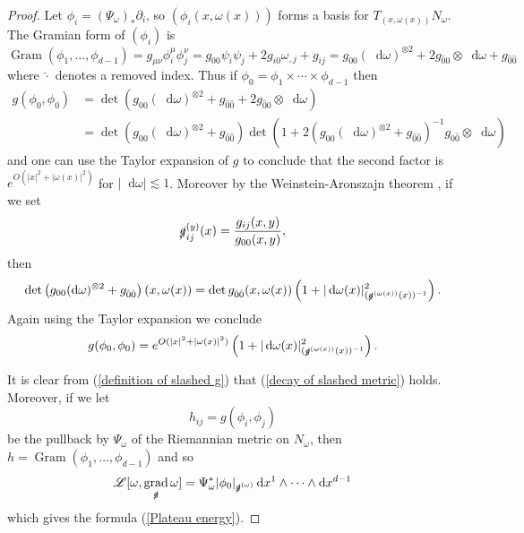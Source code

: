 \documentclass[reqno,12pt,letterpaper]{amsart}
\newcommand*\dif{\mathop{}\!\mathrm{d}}
\DeclareMathOperator{\Gram}{Gram}
\DeclareMathOperator{\grad}{grad}
\newcommand{\Lagrange}{\mathscr L}
\theoremstyle{definition}
\numberwithin{equation}{section}
\begin{document}
\begin{proof}
Let $\phi_i = (\Psi_\omega)_* \partial_i$, so $(\phi_i(x, \omega(x)))$ forms a basis for $T_{(x, \omega(x))} N_\omega$.
The Gramian form of $(\phi_i)$ is
$$\Gram(\phi_1, \dots, \phi_{d - 1}) = g_{\mu \nu} \phi_i^\mu \phi_j^\nu = g_{00} \psi_i \psi_j + 2g_{i0} \omega_{,j} + g_{ij} = g_{00} (\dif \omega)^{\otimes 2}
+ 2g_{\hat 0 0} \otimes \dif \omega + g_{\hat 0 \hat 0}$$
where $\hat \cdot$ denotes a removed index. Thus if $\phi_0 = \phi_1 \times \cdots \times \phi_{d - 1}$ then
\begin{align*}
g(\phi_0, \phi_0) &= \det \left(g_{00} (\dif \omega)^{\otimes 2} + g_{\hat 0 \hat 0} + 2g_{\hat 0 0} \otimes \dif \omega\right) \\
&= \det \left(g_{00} (\dif \omega)^{\otimes 2} + g_{\hat 0 \hat 0}\right) \det \left(1 + 2 (g_{00} (\dif \omega)^{\otimes 2} + g_{\hat 0 \hat 0})^{-1} g_{0 \hat 0} \otimes \dif \omega\right)
\end{align*}
and one can use the Taylor expansion of $g$ to conclude that the second factor is $e^{O(|x|^2 + |\omega(x)|^2)}$ for $|\dif \omega| \lesssim 1$.
Moreover by the Weinstein-Aronszajn theorem \cite{Tao13}, if we set
\begin{equation}\label{definition of slashed g}
\slashed g^{(y)}_{ij}(x) = \frac{g_{ij}(x, y)}{g_{00}(x, y)},
\end{equation}
then
$$\det \left(g_{00} (\dif \omega)^{\otimes 2} + g_{\hat 0 \hat 0}\right)(x, \omega(x)) = \det g_{\hat 0\hat 0}(x, \omega(x)) \left(1 + |\dif \omega(x)|_{(\slashed g^{(\omega(x))}(x))^{-1}}^2\right).$$
Again using the Taylor expansion we conclude
\begin{equation}\label{norm of phi0}
g(\phi_0, \phi_0) = e^{O(|x|^2 + |\omega(x)|^2)} \left(1 + |\dif \omega(x)|_{(\slashed g^{(\omega(x))}(x))^{-1}}^2\right).
\end{equation}

It is clear from (\ref{definition of slashed g}) that (\ref{decay of slashed metric}) holds.
Moreover, if we let
$$h_{ij} = g(\phi_i, \phi_j)$$
be the pullback by $\Psi_\omega$ of the Riemannian metric on $N_\omega$, then $h = \Gram(\phi_1, \dots, \phi_{d - 1})$ and so
$$\Lagrange[\omega, \grad_{\slashed g} \omega] = \Psi_\omega^* |\phi_0|_{\slashed g^{(\omega)}} \dif x^1 \wedge \cdots \wedge \dif x^{d - 1}$$
which gives the formula (\ref{Plateau energy}).


\end{proof}
\end{document}
